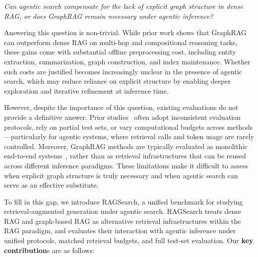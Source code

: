 \textit{Can agentic search compensate for the lack of explicit graph structure in dense RAG, or does GraphRAG remain necessary under agentic inference?}

Answering this question is non-trivial. While prior work shows that GraphRAG can outperform dense RAG on multi-hop and compositional reasoning tasks, these gains come with substantial offline preprocessing cost, including entity extraction, summarization, graph construction, and index maintenance. Whether such costs are justified becomes increasingly unclear in the presence of agentic search, which may reduce reliance on explicit structure by enabling deeper exploration and iterative refinement at inference time.

However, despite the importance of this question, existing evaluations do not provide a definitive answer. Prior studies~\cite{luo2025graphr1,jin2025searchr1,lee2025hybgrag,yu2025graphragr1} often adopt inconsistent evaluation protocols, rely on partial test sets, or vary computational budgets across methods—particularly for agentic systems, where retrieval calls and token usage are rarely controlled. Moreover, GraphRAG methods are typically evaluated as monolithic end-to-end systems~\cite{dong2025youtu}, rather than as retrieval infrastructures that can be reused across different inference paradigms. These limitations make it difficult to assess when explicit graph structure is truly necessary and when agentic search can serve as an effective substitute.

To fill in this gap, we introduce RAGSearch, a unified benchmark for studying retrieval-augmented generation under agentic search. RAGSearch treats dense RAG and graph-based RAG as alternative retrieval infrastructures within the RAG paradigm, and evaluates their interaction with agentic inference under unified protocols, matched retrieval budgets, and full test-set evaluation. Our \textbf{key contribution}s are as follows:
\vspace{-10pt}

